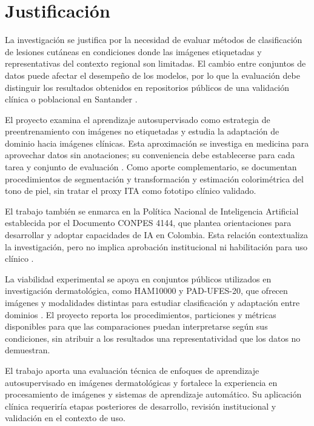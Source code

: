 \chapter{Justificación}

La investigación se justifica por la necesidad de evaluar métodos de clasificación de lesiones cutáneas en condiciones donde las imágenes etiquetadas y representativas del contexto regional son limitadas. El cambio entre conjuntos de datos puede afectar el desempeño de los modelos, por lo que la evaluación debe distinguir los resultados obtenidos en repositorios públicos de una validación clínica o poblacional en Santander \parencite{yang2024crosshospital}.

El proyecto examina el aprendizaje autosupervisado como estrategia de preentrenamiento con imágenes no etiquetadas y estudia la adaptación de dominio hacia imágenes clínicas. Esta aproximación se investiga en medicina para aprovechar datos sin anotaciones; su conveniencia debe establecerse para cada tarea y conjunto de evaluación \parencite{krishnan2022selfsupervisedmedicine}. Como aporte complementario, se documentan procedimientos de segmentación y transformación y estimación colorimétrica del tono de piel, sin tratar el proxy ITA como fototipo clínico validado.

El trabajo también se enmarca en la Política Nacional de Inteligencia Artificial establecida por el Documento CONPES 4144, que plantea orientaciones para desarrollar y adoptar capacidades de IA en Colombia. Esta relación contextualiza la investigación, pero no implica aprobación institucional ni habilitación para uso clínico \parencite{dnp2025conpes4144}.

La viabilidad experimental se apoya en conjuntos públicos utilizados en investigación dermatológica, como HAM10000 y PAD-UFES-20, que ofrecen imágenes y modalidades distintas para estudiar clasificación y adaptación entre dominios \parencite{tschandl2018ham10000,pacheco2020padufes}. El proyecto reporta los procedimientos, particiones y métricas disponibles para que las comparaciones puedan interpretarse según sus condiciones, sin atribuir a los resultados una representatividad que los datos no demuestran.

El trabajo aporta una evaluación técnica de enfoques de aprendizaje autosupervisado en imágenes dermatológicas y fortalece la experiencia en procesamiento de imágenes y sistemas de aprendizaje automático. Su aplicación clínica requeriría etapas posteriores de desarrollo, revisión institucional y validación en el contexto de uso.
